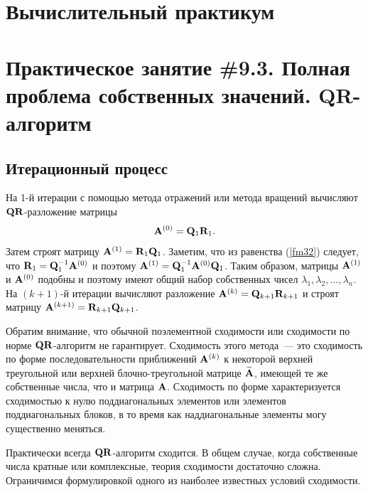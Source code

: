 \documentclass[12pt]{article}
\begin{document}
	\begin{flushright}
	\end{flushright}
	\begin{flushright}
	\end{flushright}
    \section*{Вычислительный практикум}
    \section*{Практическое занятие \#9.3. Полная проблема собственных значений. QR-алгоритм}

	\subsection*{Итерационный процесс}
	
	На 1-й итерации с помощью метода отражений или метода вращений вычисляют $\bold{QR}$-разложение матрицы
	\begin{equation}
		\bold{A}^{\left(0\right)}=\bold{Q}_1\bold{R}_1.\label{fm32}
	\end{equation}
	Затем строят матрицу $\bold{A}^{\left(1\right)}=\bold{R}_1\bold{Q}_1$. Заметим, что из равенства (\ref{fm32}) следует, что $\bold{R}_1=\bold{Q}^{-1}_1\bold{A}^{\left(0\right)}$ и поэтому $\bold{A}^{\left(1\right)}=\bold{Q}_1^{-1}\bold{A}^{\left(0\right)}\bold{Q}_1$. Таким образом, матрицы $\bold{A}^{\left(1\right)}$ и $\bold{A}^{\left(0\right)}$ подобны и поэтому имеют общий набор собственных чисел $\lambda_1,\lambda_2,\ldots,\lambda_n$. На $\left(k+1\right)$-й итерации вычисляют разложение $\bold{A}^{\left(k\right)}=\bold{Q}_{k+1}\bold{R}_{k+1}$ и строят матрицу $\bold{A}^{\left(k+1\right)}=\bold{R}_{k+1}\bold{Q}_{k+1}$.
	
	Обратим внимание, что обычной поэлементной сходимости или сходимости по норме $\bold{QR}$-алгоритм не гарантирует. Сходимость этого метода~--- это сходимость по форме последовательности приближений $\bold{A}^{\left(k\right)}$ к некоторой верхней треугольной или верхней блочно-треугольной матрице $\widetilde{\bold{A}}$, имеющей те же собственные числа, что и матрица $\bold{A}$. Сходимость по форме характеризуется сходимостью к нулю поддиагональных элементов или элементов поддиагональных блоков, в то время как наддиагональные элементы могу существенно меняться.
	
	Практически всегда $\bold{QR}$-алгоритм сходится. В общем случае, когда собственные числа кратные или комплексные, теория сходимости достаточно сложна. Ограничимся формулировкой одного из наиболее известных условий сходимости.
	
\end{document}
